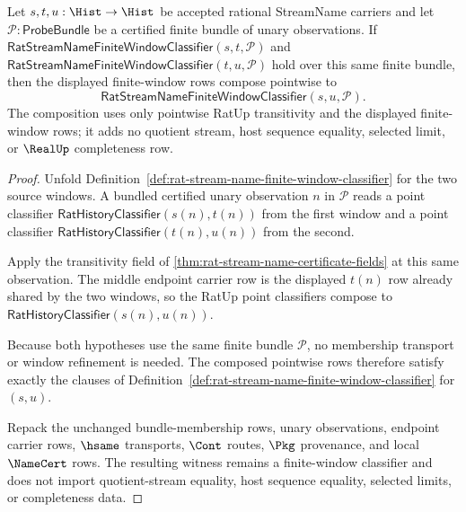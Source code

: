 \begin{theorem}
\label{thm:streamname-finite-window-pointwise-transitivity}
Let $s,t,u:\Hist\to\Hist$ be accepted rational StreamName carriers and let
$\mathcal{P}:\mathsf{ProbeBundle}$ be a certified finite bundle of unary
observations. If
$\mathsf{RatStreamNameFiniteWindowClassifier}(s,t,\mathcal{P})$ and
$\mathsf{RatStreamNameFiniteWindowClassifier}(t,u,\mathcal{P})$ hold over this
same finite bundle, then the displayed finite-window rows compose pointwise to
$$
\mathsf{RatStreamNameFiniteWindowClassifier}(s,u,\mathcal{P}).
$$
The composition uses only pointwise RatUp transitivity and the displayed
finite-window rows; it adds no quotient stream, host sequence equality,
selected limit, or $\RealUp$ completeness row.
\end{theorem}
\begin{proof}
Unfold Definition~\ref{def:rat-stream-name-finite-window-classifier} for the
two source windows. A bundled certified unary observation $n$ in
$\mathcal{P}$ reads a point classifier
$\mathsf{RatHistoryClassifier}(s(n),t(n))$ from the first window and a point
classifier $\mathsf{RatHistoryClassifier}(t(n),u(n))$ from the second.

Apply the transitivity field of
\autoref{thm:rat-stream-name-certificate-fields} at this same observation. The
middle endpoint carrier row is the displayed $t(n)$ row already shared by the
two windows, so the RatUp point classifiers compose to
$\mathsf{RatHistoryClassifier}(s(n),u(n))$.

Because both hypotheses use the same finite bundle $\mathcal{P}$, no
membership transport or window refinement is needed. The composed pointwise
rows therefore satisfy exactly the clauses of
Definition~\ref{def:rat-stream-name-finite-window-classifier} for $(s,u)$.

Repack the unchanged bundle-membership rows, unary observations, endpoint
carrier rows, $\hsame$ transports, $\Cont$ routes, $\Pkg$ provenance, and local
$\NameCert$ rows. The resulting witness remains a finite-window classifier and
does not import quotient-stream equality, host sequence equality, selected
limits, or completeness data.
\end{proof}
